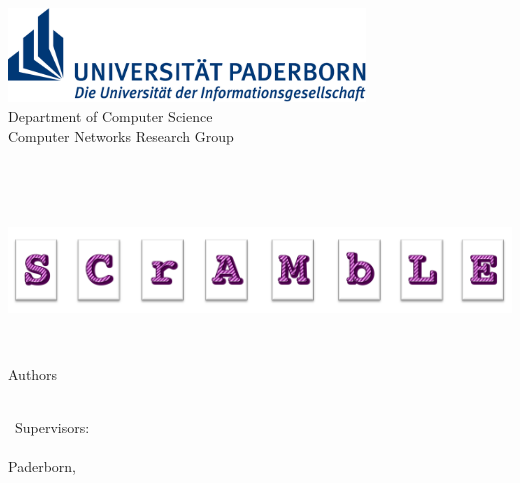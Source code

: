 
\begin{titlepage}	
	\begin{center}
		\begin{minipage}{135mm}
			\centering
			\includegraphics[height=25mm]{figures/uni-logo}\\
				\vspace{2mm}			
			\textsf{
				\hspace*{8mm} 
				Department of Computer Science\\
				\hspace*{8mm}   Computer Networks Research Group \\
			}	
			
			
		\end{minipage}\\[40pt]
		
		
		

		{\Huge\textbf{\thetitle{}}}\\[30pt]

	\begin{minipage}{4000mm}
	\hspace*{-1.3cm} 
	\includegraphics[height=30mm]{figures/CuK-Logo2_rot}
\end{minipage}\\[10pt]
		\huge Authors\vspace{4mm}
	
		{\huge \textsc{\theauthor{}}}\\[30pt]

		\ Supervisors:\\
		
		{\huge \textsc \thesupervisor{}}\\[30pt]

		Paderborn, \thesubmissiondate{}
	\end{center}
\end{titlepage}


